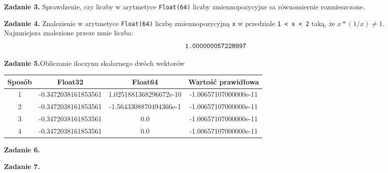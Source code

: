 \documentclass[15pt, a4paper]{article}
\begin{document}

\vspace{0.5cm}

\noindent\textbf{Zadanie 3.} Sprawdzenie, czy liczby w arytmetyce \verb|Float(64)| liczby zmiennopozycyjne sa równomiernie rozmieszczone.

\vspace{0.5cm}

\noindent\hrulefill


\vspace{0.5cm}

\noindent\textbf{Zadanie 4.} Znalezienie w arytmetyce \verb|Float(64)| liczbę zmiennopozycyjną \verb|x| w przedziale \verb|1 < x < 2| taką, że $x * (1/x) \neq 1$.
\\
Najmniejsza znalezione przeze mnie liczba: \[\verb|1.000000057228997|\]

\vspace{0.5cm}

\noindent\hrulefill


\vspace{0.5cm}

\noindent\textbf{Zadanie 5.}Obliczanie iloczynu skalarnego dwóch wektorów

\begin{table}[ht]
    \begin{tabular}{|c|c|c|c|}
        \hline 
        Sposób & Float32 & Float64 & Wartość prawidłowa \\ \hline
        1 & -0.3472038161853561 & 1.0251881368296672e-10 & -1.00657107000000e-11 \\ \hline
        2 & -0.3472038161853561 & -1.5643308870494366e-1 & -1.00657107000000e-11 \\ \hline
        3 & -0.3472038161853561 & 0.0 & -1.00657107000000e-11  \\ \hline
        4 & -0.3472038161853561 & 0.0 & -1.00657107000000e-11 \\ \hline
    \end{tabular}
    \label{tab:macheps}
\end{table}


\vspace{0.5cm}

\noindent\hrulefill


\vspace{0.5cm}

\noindent\textbf{Zadanie 6.} 

\vspace{0.5cm}

\noindent\hrulefill


\vspace{0.5cm}

\noindent\textbf{Zadanie 7.}
\end{document}
